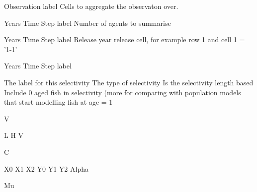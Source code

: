  {Observation label}
 {Cells to aggregate the observaton over.}
\par\textbf{}\par
\par\textbf{}\par
{} {Years}
 {Time Step label}
 {Number of agents to summarise}
\par\textbf{}\par
{} {Years}
 {Time Step label}
 {Release year}
 {release cell, for example row 1 and cell 1 = '1-1'}
\par\textbf{}\par
\par\textbf{}\par
{} {Years}
 {Time Step label}
\par\par
{} {The label for this selectivity}
 {The type of selectivity}
 {Is the selectivity length based}
 {Include 0 aged fish in selectivity (more for comparing with population models that start modelling fish at age = 1}
\par\textbf{}\par
{} {V}
\par\textbf{}\par
{} {L}
 {H}
 {V}
\par\textbf{}\par
{} {C}
\par\textbf{}\par
{} {X0}
 {X1}
 {X2}
 {Y0}
 {Y1}
 {Y2}
 {Alpha}
\par\textbf{}\par
{} {Mu}

